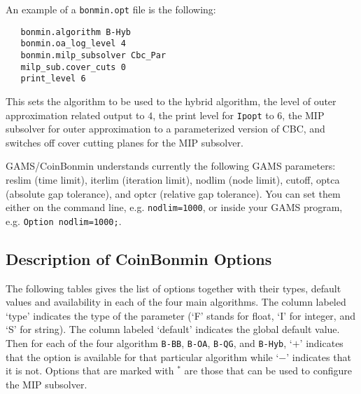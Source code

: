 An example of a \texttt{bonmin.opt} file is the following:
\begin{verbatim}
   bonmin.algorithm B-Hyb
   bonmin.oa_log_level 4
   bonmin.milp_subsolver Cbc_Par
   milp_sub.cover_cuts 0
   print_level 6
\end{verbatim}
This sets the algorithm to be used to the hybrid algorithm, the level of outer approximation related output to $4$, the print level for \texttt{Ipopt} to $6$, the MIP subsolver for outer approximation to a parameterized version of CBC, and switches off cover cutting planes for the MIP subsolver.

GAMS/CoinBonmin understands currently the following GAMS parameters: reslim (time limit), iterlim (iteration limit), nodlim (node limit), cutoff, optca (absolute gap tolerance), and optcr (relative gap tolerance).
You can set them either on the command line, e.g. \verb+nodlim=1000+, or inside your GAMS program, e.g. \verb+Option nodlim=1000;+.

\subsection{Description of CoinBonmin Options}
\label{sub:bonminoptions}

The following tables gives the list of options together with their types, default values and availability in each of the four main algorithms.
The column labeled `type' indicates the type of the parameter (`F' stands for float, `I' for integer, and `S' for
string).
The column labeled `default' indicates the global default value.
Then for each of the four algorithm \texttt{B-BB}, \texttt{B-OA}, \texttt{B-QG}, and \texttt{B-Hyb}, `$+$' indicates that the option is available for that particular algorithm while `$-$' indicates that it is not.
Options that are marked with $^*$ are those that can be used to configure the MIP subsolver.

